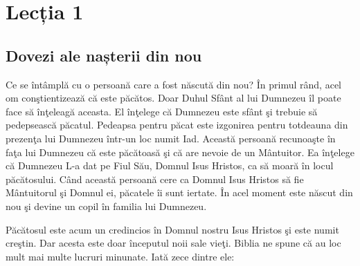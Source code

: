 \newpage

\section*{Lecția 1}

\subsection*{Dovezi ale nașterii din nou}

Ce se întâmplă cu o persoană care a fost născută din nou? În primul rând, acel om conştientizează că este păcătos. Doar Duhul Sfânt al lui Dumnezeu îl poate face să înţeleagă aceasta. El înţelege că Dumnezeu este sfânt şi trebuie să pedepsească păcatul. Pedeapsa pentru păcat este izgonirea pentru totdeauna din prezenţa lui Dumnezeu într-un loc numit Iad. Această persoană recunoaşte în faţa lui Dumnezeu că este păcătoasă şi că are nevoie de un Mântuitor. Ea înţelege că Dumnezeu L-a dat pe Fiul Său, Domnul Isus Hristos, ca să moară în locul păcătosului. Când această persoană cere ca Domnul Isus Hristos să fie Mântuitorul şi Domnul ei, păcatele îi sunt iertate. În acel moment este născut din nou şi devine un copil în familia lui Dumnezeu.

Păcătosul este acum un credincios în Domnul nostru Isus Hristos şi este numit creştin. Dar acesta este doar începutul noii sale vieţi. Biblia ne spune că au loc mult mai multe lucruri minunate. Iată zece dintre ele:



